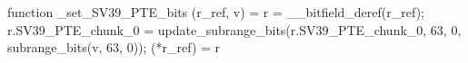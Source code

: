 function _set_SV39_PTE_bits (r_ref, v) = {
    r = __bitfield_deref(r_ref);
    r.SV39_PTE_chunk_0 = update_subrange_bits(r.SV39_PTE_chunk_0, 63, 0, subrange_bits(v, 63, 0));
    (*r_ref) = r
}
